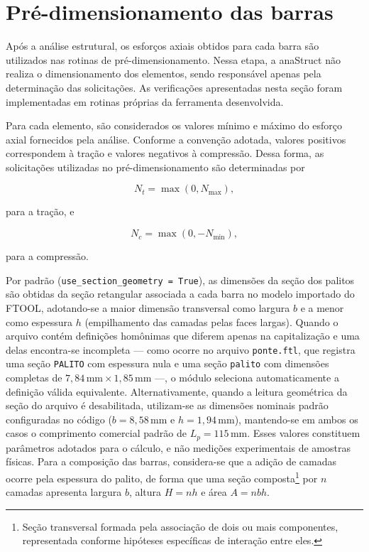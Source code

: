 \section{Pré-dimensionamento das barras}
\label{sec:metodologia-pre-dimensionamento}

Após a análise estrutural, os esforços axiais obtidos para cada barra são utilizados nas rotinas de pré-dimensionamento. Nessa etapa, a anaStruct não realiza o dimensionamento dos elementos, sendo responsável apenas pela determinação das solicitações. As verificações apresentadas nesta seção foram implementadas em rotinas próprias da ferramenta desenvolvida.

Para cada elemento, são considerados os valores mínimo e máximo do esforço axial fornecidos pela análise. Conforme a convenção adotada, valores positivos correspondem à tração e valores negativos à compressão. Dessa forma, as solicitações utilizadas no pré-dimensionamento são determinadas por

\begin{equation}
    N_t = \max(0,N_{\max}),
\end{equation}

para a tração, e

\begin{equation}
    N_c = \max(0,-N_{\min}),
\end{equation}

para a compressão.

Por padrão (\texttt{use\_section\_geometry = True}), as dimensões da seção dos palitos são obtidas da seção retangular associada a cada barra no modelo importado do \acrshort{FTOOL}, adotando-se a maior dimensão transversal como largura \(b\) e a menor como espessura \(h\) (empilhamento das camadas pelas faces largas). Quando o arquivo contém definições homônimas que diferem apenas na capitalização e uma delas encontra-se incompleta — como ocorre no arquivo \texttt{ponte.ftl}, que registra uma seção \texttt{PALITO} com espessura nula e uma seção \texttt{palito} com dimensões completas de \(7,84\,\mathrm{mm}\times 1,85\,\mathrm{mm}\) —, o módulo seleciona automaticamente a definição válida equivalente. Alternativamente, quando a leitura geométrica da seção do arquivo é desabilitada, utilizam-se as dimensões nominais padrão configuradas no código (\(b = 8,58\,\mathrm{mm}\) e \(h = 1,94\,\mathrm{mm}\)), mantendo-se em ambos os casos o comprimento comercial padrão de \(L_p = 115\,\mathrm{mm}\). Esses valores constituem parâmetros adotados para o cálculo, e não medições experimentais de amostras físicas. Para a composição das barras, considera-se que a adição de camadas ocorre pela espessura do palito, de forma que uma seção composta\footnote{Seção transversal formada pela associação de dois ou mais componentes, representada conforme hipóteses específicas de interação entre eles.} por \(n\) camadas apresenta largura \(b\), altura \(H=nh\) e área \(A=nbh\).

